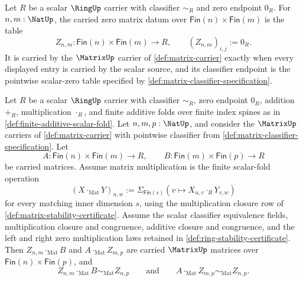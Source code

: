\begin{definition}
\label{def:finite-fold-zero-matrix-data}
Let $R$ be a scalar $\RingUp$ carrier with classifier $\sim_R$ and zero endpoint $0_R$. For $n,m:\NatUp$, the carried zero matrix datum over $\mathsf{Fin}(n)\times\mathsf{Fin}(m)$ is the table
$$
Z_{n,m}:\mathsf{Fin}(n)\times\mathsf{Fin}(m)\to R,
\qquad
(Z_{n,m})_{i,j}:=0_R.
$$
It is carried by the $\MatrixUp$ carrier of \autoref{def:matrix-carrier} exactly when every displayed entry is carried by the scalar source, and its classifier endpoint is the pointwise scalar-zero table specified by \autoref{def:matrix-classifier-specification}.
\end{definition}

\begin{theorem}
\label{thm:finite-fold-matrix-zero-multiplication-law}
Let $R$ be a scalar $\RingUp$ carrier with classifier $\sim_R$, zero endpoint $0_R$, addition $+_R$, multiplication $\cdot_R$, and finite additive folds over finite index spines as in \autoref{def:finite-additive-scalar-fold}. Let $n,m,p:\NatUp$, and consider the $\MatrixUp$ carriers of \autoref{def:matrix-carrier} with pointwise classifier from \autoref{def:matrix-classifier-specification}. Let
$$
A:\mathsf{Fin}(n)\times\mathsf{Fin}(m)\to R,
\qquad
B:\mathsf{Fin}(m)\times\mathsf{Fin}(p)\to R
$$
be carried matrices. Assume matrix multiplication is the finite scalar-fold operation
$$
(X\cdot_{\mathrm{Mat}}Y)_{u,w}:=
\Sigma_{\mathsf{Fin}(s)}(v\mapsto X_{u,v}\cdot_RY_{v,w})
$$
for every matching inner dimension $s$, using the multiplication closure row of \autoref{def:matrix-stability-certificate}. Assume the scalar classifier equivalence fields, multiplication closure and congruence, additive closure and congruence, and the left and right zero multiplication laws retained in \autoref{def:ring-stability-certificate}. Then $Z_{n,m}\cdot_{\mathrm{Mat}}B$ and $A\cdot_{\mathrm{Mat}}Z_{m,p}$ are carried $\MatrixUp$ matrices over $\mathsf{Fin}(n)\times\mathsf{Fin}(p)$, and
$$
Z_{n,m}\cdot_{\mathrm{Mat}}B\sim_{\mathrm{Mat}}Z_{n,p}
\qquad\text{and}\qquad
A\cdot_{\mathrm{Mat}}Z_{m,p}\sim_{\mathrm{Mat}}Z_{n,p}.
$$
\end{theorem}
